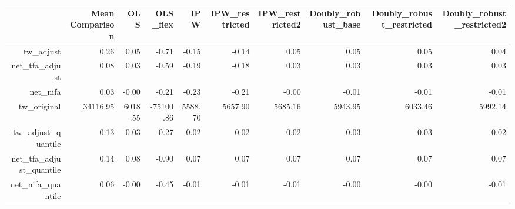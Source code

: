 \begin{table}[ht]
\centering
\begin{tabular}{rrrrrrrrrr}
  \hline
 & Mean Comparison & OLS & OLS\_flex & IPW & IPW\_restricted & IPW\_restricted2 & Doubly\_robust\_base & Doubly\_robust\_restricted & Doubly\_robust\_restricted2 \\ 
  \hline
tw\_adjust & 0.26 & 0.05 & -0.71 & -0.15 & -0.14 & 0.05 & 0.05 & 0.05 & 0.04 \\ 
  net\_tfa\_adjust & 0.08 & 0.03 & -0.59 & -0.19 & -0.18 & 0.03 & 0.03 & 0.03 & 0.03 \\ 
  net\_nifa & 0.03 & -0.00 & -0.21 & -0.23 & -0.21 & -0.00 & -0.01 & -0.01 & -0.01 \\ 
  tw\_original & 34116.95 & 6018.55 & -75100.86 & 5588.70 & 5657.90 & 5685.16 & 5943.95 & 6033.46 & 5992.14 \\ 
  tw\_adjust\_quantile & 0.13 & 0.03 & -0.27 & 0.02 & 0.02 & 0.02 & 0.03 & 0.03 & 0.02 \\ 
  net\_tfa\_adjust\_quantile & 0.14 & 0.08 & -0.90 & 0.07 & 0.07 & 0.07 & 0.07 & 0.07 & 0.07 \\ 
  net\_nifa\_quantile & 0.06 & -0.00 & -0.45 & -0.01 & -0.01 & -0.01 & -0.00 & -0.00 & -0.01 \\ 
   \hline
\end{tabular}
\end{table}
